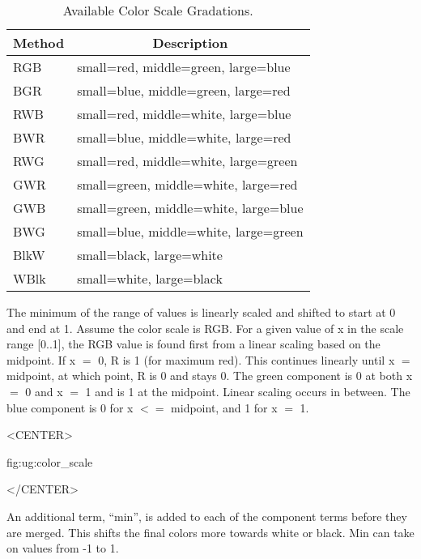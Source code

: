 \begin{table}[htb]
  \hspace{0.7in}
  \begin{tabular}{|l|l|} \hline
    \multicolumn{1}{|c}{Method} &
        \multicolumn{1}{|c|}{Description} \\ \hline\hline
    RGB		& small=red,   middle=green, large=blue \\
    BGR		& small=blue,  middle=green, large=red \\
    RWB		& small=red,   middle=white, large=blue \\
    BWR		& small=blue,  middle=white, large=red \\
    RWG		& small=red,   middle=white, large=green \\
    GWR		& small=green, middle=white, large=red \\
    GWB		& small=green, middle=white, large=blue \\
    BWG		& small=blue,  middle=white, large=green \\
    BlkW	& small=black, large=white \\
    WBlk	& small=white, large=black \\ \hline
  \end{tabular}
  \caption{Available Color Scale Gradations.}
  \label{table:ug:gradmethods}
\end{table}


The minimum of the range of values is linearly scaled and shifted to
start at 0 and end at 1.  Assume the color scale is RGB.  For a given
value of x in the scale range [0..1], the RGB value is found first
from a linear scaling based on the midpoint.
If x $=$ 0, R is 1 (for maximum red).  This continues linearly until x
$=$ midpoint, at which point, R is 0 and stays 0.
The green component is 0 at both x $=$ 0 and x $=$ 1 and is 1 at the
midpoint.  Linear scaling occurs in between.
The blue component is 0 for x $<=$ midpoint, and 1 for x $=$ 1.
\begin{rawhtml}
<CENTER>
\end{rawhtml}
{fig:ug:color_scale}
\begin{rawhtml}
</CENTER>
\end{rawhtml}

An additional term, ``min'', is added to each of the component terms
before they are merged.  This shifts the final colors more towards
white or black.  Min can take on values from -1 to 1.

